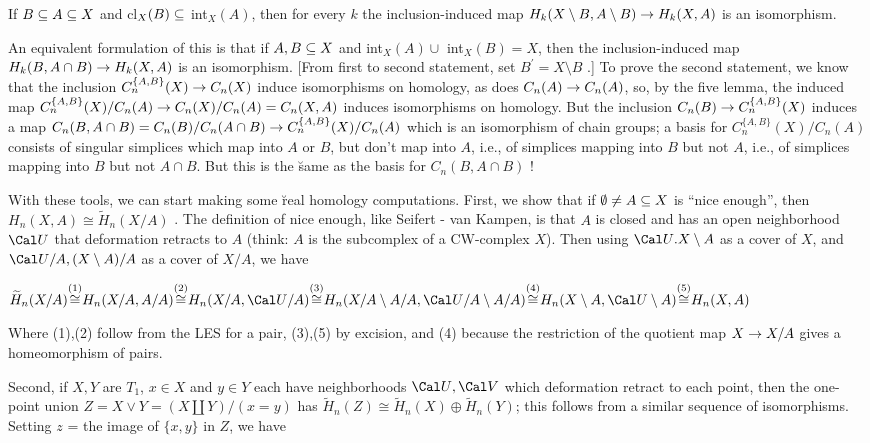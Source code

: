 \msk

If $B\subseteq A\subseteq X$ and cl$_X(B)\subseteq$ int$_X(A)$, then for every $k$ the inclusion-induced map 
$H_k(X\setminus B,A\setminus B)\rightarrow H_k(X,A)$ is an isomorphism. 

\msk

An equivalent formulation of this is that if $A,B\subseteq X$ and int$_X(A)\cup$ int$_X(B) = X$, then the
inclusion-induced map $H_k(B,A\cap B)\rightarrow H_k(X,A)$ is an isomorphism. [From first to second
statement, set $B^\prime = X\setminus B$ .] To prove the second statement, we know that
the inclusion $C_n^{\{A,B\}}(X) \rightarrow C_n(X)$ induce isomorphisms on homology, as does 
$C_n(A) \rightarrow C_n(A)$, so, by the five lemma, the induced map
$C_n^{\{A,B\}}(X)/C_n(A) \rightarrow C_n(X)/C_n(A) = C_n(X,A)$ induces isomorphisms on homology. 
But the inclusion $C_n(B) \rightarrow C_n^{\{A,B\}}(X)$ induces a map 
$C_n(B,A\cap B) = C_n(B)/C_n(A\cap B) \rightarrow C_n^{\{A,B\}}(X)/C_n(A)$ which is an isomorphism of chain groups;
a basis for $C_n^{\{A,B\}}(X)/C_n(A)$ consists of singular simplices which map into $A$ or $B$, but don't map into $A$,
i.e., of simplices mapping into $B$ but not $A$, i.e., of simplices mapping into $B$ but not $A\cap B$.
But this is the \u{same} as the basis for $C_n(B,A\cap B)$ !

\msk

With these tools, we can start making some \u{real} homology computations. First, we show that 
if $\emptyset\neq A\subseteq X$ is ``nice enough'', then $H_n(X,A)\cong \widetilde{H}_n(X/A)$ .
The definition of nice enough, like Seifert - van Kampen, is that $A$ is closed and has an open neighborhood
${\Cal U}$ that deformation retracts to $A$ (think: $A$ is the subcomplex of a CW-complex $X$).
Then using ${\Cal U}.X\setminus A$ as a cover of $X$, and ${\Cal U}/A,(X\setminus A)/A$ as a cover of $X/A$,
 we have

\ssk

$\widetilde{H}_n(X/A) {\buildrel {(1)}\over \cong} H_n(X/A,A/A){\buildrel {(2)}\over \cong} 
H_n(X/A,{\Cal U}/A) {\buildrel {(3)}\over \cong} H_n(X/A\setminus A/A,{\Cal U}/A\setminus A/A) {\buildrel {(4)}\over \cong}
H_n(X\setminus A,{\Cal U}\setminus A){\buildrel {(5)}\over \cong} H_n(X,A)$

\ssk

Where (1),(2) follow from the LES for a pair, (3),(5) by excision, and (4) because the restriction of the quotient
map $X\rightarrow X/A$ gives a homeomorphism of pairs.

\msk

Second, if $X,Y$ are $T_1$, $x\in X$ and $y\in Y$ each have neighborhoods 
${\Cal U},{\Cal V}$ which deformation retract to each point, then the 
one-point union $Z=X\vee Y = (X\coprod Y)/(x=y)$ has $\widetilde{H}_n(Z) \cong \widetilde{H}_n(X)\oplus \widetilde{H}_n(Y)$;
this follows from a similar sequence of isomorphisms. Setting $z$ = the image of $\{x,y\}$ in $Z$, we have

